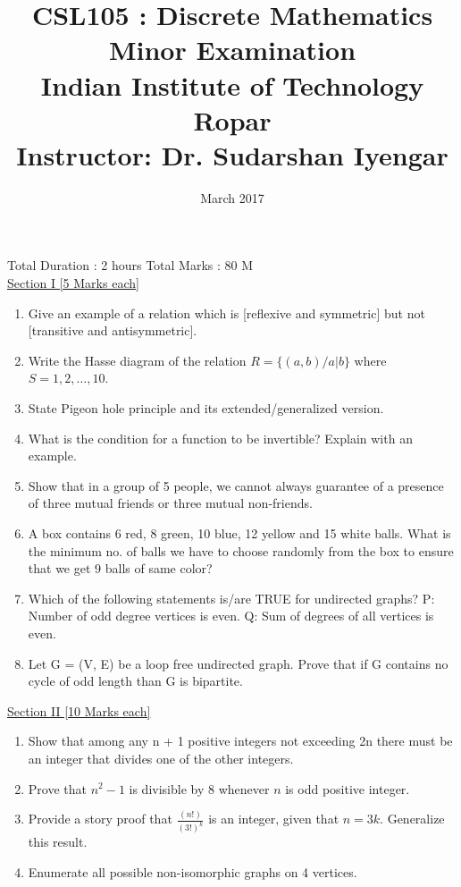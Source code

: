 \documentclass{article}
\title{CSL105 : Discrete Mathematics\\
\large{Minor Examination}\\
\large{Indian Institute of Technology Ropar}\\
\small{Instructor: Dr. Sudarshan Iyengar}
}
\date{March 2017}
\begin{document}
\maketitle
Total Duration : 2 hours \hfill Total Marks : 80 M\\

\underline{\large{Section I \hspace*{7cm} [5 Marks each]}}
\begin{enumerate} 
\item Give an example of a relation which is [reflexive and symmetric] but not [transitive and antisymmetric].
\item Write the Hasse diagram of the relation $R=\{(a,b)/a|b\}$ where $S={1,2,\dots,10}$. 
\item State Pigeon hole principle and its extended/generalized version.
\item What is the condition for a function to be invertible? Explain with an example. 
\item Show that in a group of 5 people, we cannot always guarantee of a presence of three mutual friends or three mutual non-friends. 
\item A box contains 6 red, 8 green, 10 blue, 12 yellow and 15 white balls. What is the minimum
no. of balls we have to choose randomly from the box to ensure that we get 9 balls of same
color?
\item Which of the following statements is/are TRUE for undirected graphs? P: Number of odd
degree vertices is even. Q: Sum of degrees of all vertices is even. 
\item Let G = (V, E) be a loop free undirected graph. Prove that if G contains no cycle of odd
length than G is bipartite.

\end{enumerate}
\vspace*{3cm}


\underline{\large{Section II \hspace*{7cm} [10 Marks each]}}
\begin{enumerate} 
\item Show that among any n + 1 positive integers not exceeding 2n there must be an integer that divides one of the other integers. 
\item Prove that $n^2-1$ is divisible by 8 whenever $n$ is odd positive integer. 
\item Provide a story proof that $\frac{(n!)}{(3!)^k}$ is an integer, given that $n=3k$. Generalize this result.
\item Enumerate all possible non-isomorphic graphs on 4 vertices.

\end{enumerate}
\end{document}
